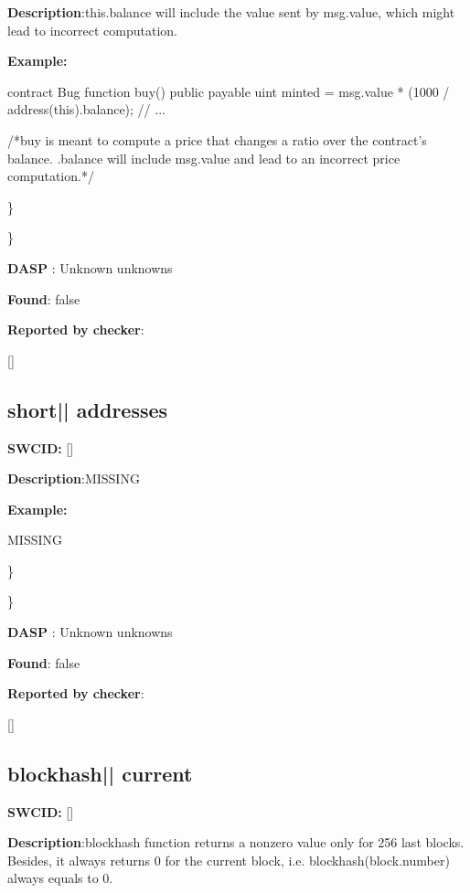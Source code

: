 \documentclass{article}
\begin{document}
\textbf{Description}:this.balance will include the value sent by msg.value, which might lead to incorrect computation.


\textbf{Example:} 
\begin{ffcode} 

contract Bug{
  function buy() public payable{
    uint minted = msg.value * (1000 / address(this).balance);
    // ...
  }
}

 /*buy is meant to compute a price that changes a ratio over the contract's balance. .balance will include msg.value and lead to an incorrect price computation.*/ 

\end{ffcode} 
\} 

\} 

\textbf{DASP} : Unknown unknowns

\textbf{Found}: false

\textbf{Reported by checker}: 
\begin{ffcode} 

[]
\end{ffcode} 
\subsection{short{|\textunderscore| }addresses} 
\textbf{SWC{\textunderscore }ID:} []

\textbf{Description}:MISSING


\textbf{Example:} 
\begin{ffcode} 

MISSING

\end{ffcode} 
\} 

\} 

\textbf{DASP} : Unknown unknowns

\textbf{Found}: false

\textbf{Reported by checker}: 
\begin{ffcode} 

[]
\end{ffcode} 
\subsection{blockhash{|\textunderscore| }current} 
\textbf{SWC{\textunderscore }ID:} []

\textbf{Description}:blockhash function returns a non{\textendash}zero value only for 256 last blocks. Besides, it always returns 0 for the current block, i.e. blockhash(block.number) always equals to 0.
\end{document}
